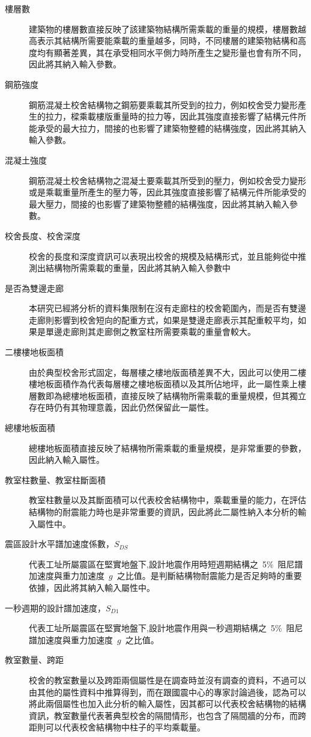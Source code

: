\begin{description}
  \item[樓層數]
  建築物的樓層數直接反映了該建築物結構所需乘載的重量的規模，樓層數越高表示其結構所需要能乘載的重量越多，同時，不同樓層的建築物結構和高度均有顯著差異，其在承受相同水平側力時所產生之變形量也會有所不同，因此將其納入輸入參數。
  \item[鋼筋強度]
  鋼筋混凝土校舍結構物之鋼筋要乘載其所受到的拉力，例如校舍受力變形產生的拉力，樑乘載樓版重量時的拉力等，因此其強度直接影響了結構元件所能承受的最大拉力，間接的也影響了建築物整體的結構強度，因此將其納入輸入參數。
  \item[混凝土強度]
  鋼筋混凝土校舍結構物之混凝土要乘載其所受到的壓力，例如校舍受力變形或是乘載重量所產生的壓力等，因此其強度直接影響了結構元件所能承受的最大壓力，間接的也影響了建築物整體的結構強度，因此將其納入輸入參數。
  \item[校舍長度、校舍深度]
  校舍的長度和深度資訊可以表現出校舍的規模及結構形式，並且能夠從中推測出結構物所需乘載的重量，因此將其納入輸入參數中
  \item[是否為雙邊走廊]
  本研究已經將分析的資料集限制在沒有走廊柱的校舍範圍內，而是否有雙邊走廊則影響到校舍短向的配重方式，如果是雙邊走廊表示其配重較平均，如果是單邊走廊則其走廊側之教室柱所需要乘載的重量會較大。
  \item[二樓樓地板面積]
  由於典型校舍形式固定，每層樓之樓地版面積差異不大，因此可以使用二樓樓地板面積作為代表每層樓之樓地板面積以及其所佔地坪，此一屬性乘上樓層數即為總樓地板面積，直接反映了結構物所需乘載的重量規模，但其獨立存在時仍有其物理意義，因此仍然保留此一屬性。
  \item[總樓地板面積]
  總樓地板面積直接反映了結構物所需乘載的重量規模，是非常重要的參數，因此納入輸入屬性。
  \item[教室柱數量、教室柱斷面積]
  教室柱數量以及其斷面積可以代表校舍結構物中，乘載重量的能力，在評估結構物的耐震能力時也是非常重要的資訊，因此將此二屬性納入本分析的輸入屬性中。
  \item[震區設計水平譜加速度係數，$S_{DS}$]
  代表工址所屬震區在堅實地盤下,設計地震作用時短週期結構之~5\%~阻尼譜加速度與重力加速度~$g$~之比值。是判斷結構物耐震能力是否足夠時的重要依據，因此將其納入輸入屬性中。
  \item[一秒週期的設計譜加速度，$S_{D1}$]
  代表工址所屬震區在堅實地盤下,設計地震作用與一秒週期結構之~5\%~阻尼譜加速度與重力加速度~$g$~之比值。
  \item[教室數量、跨距]
  校舍的教室數量以及跨距兩個屬性是在調查時並沒有調查的資料，不過可以由其他的屬性資料中推算得到，而在跟國震中心的專家討論過後，認為可以將此兩個屬性也加入此分析的輸入屬性，因其都可以代表校舍結構物的結構資訊，教室數量代表著典型校舍的隔間情形，也包含了隔間牆的分布，而跨距則可以代表校舍結構物中柱子的平均乘載量。
\end{description}

